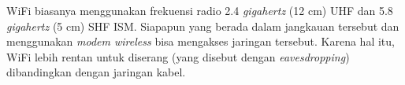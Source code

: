 WiFi biasanya menggunakan frekuensi radio 2.4 \textit{gigahertz} (12 cm) UHF dan 5.8 \textit{gigahertz} (5 cm) SHF ISM. Siapapun yang berada dalam jangkauan tersebut dan menggunakan \textit{modem wireless} bisa mengakses jaringan tersebut. Karena hal itu, WiFi lebih rentan untuk diserang (yang disebut dengan \textit{eavesdropping}) dibandingkan dengan jaringan kabel.